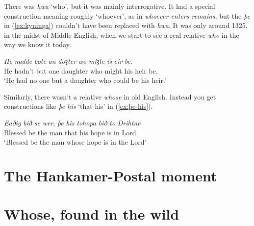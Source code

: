 There was \textit{hwa} `who', but it was mainly interrogative. It had a special construction meaning roughly `whoever', as in \textit{whoever enters remains}, but the \textit{þe} in (\ref{ex:kyninga}) couldn't have been replaced with \textit{hwa}. It was only around 1325, in the midst of Middle English, when we start to see a real relative \textit{who} in the way we know it today.

\ea \label{ex:doȝter-wo}
    \gll \textit{He} \textit{nadde} \textit{bote} \textit{an} \textit{doȝter} \textit{wo} \textit{miȝte} \textit{is} \textit{eir} \textit{be}.\\
        He hadn't but one daughter who might his heir be.\\
    \glt `He had no one but a daughter who could be his heir.'
\z

Similarly, there wasn't a relative \textit{whose} in old English. Instead you get constructions like \textit{þe his} `that his' in (\ref{ex:þe-his}).

\ea \label{ex:þe-his}
    \gll \textit{Eaðig} \textit{bið} \textit{se} \textit{wer}, \textit{þe} \textit{his} \textit{tohopa} \textit{bið} \textit{to} \textit{Drihtne}\\
        Blessed be the man that his hope is in Lord.\\
    \glt `Blessed be the man whose hope is in the Lord'
\z

\section{The Hankamer-Postal moment}

%

\section{Whose, found in the wild}

%
%


